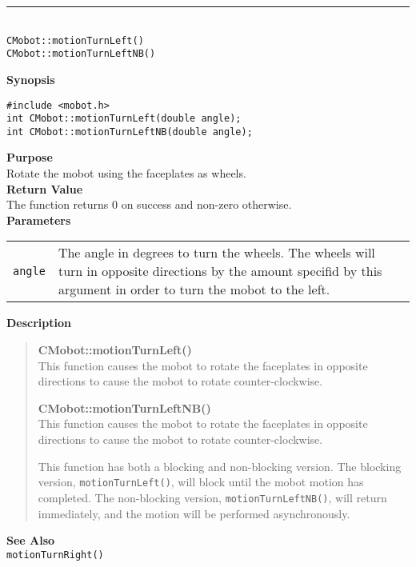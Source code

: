 \noindent
\vspace{5pt}
\rule{4.5in}{0.015in}\\
\noindent
{\LARGE \texttt{CMobot::motionTurnLeft()}}\\
{\LARGE \texttt{CMobot::motionTurnLeftNB()}}\\
{}

\noindent
{\bf Synopsis}
\vspace{-8pt}
\begin{verbatim}
#include <mobot.h>
int CMobot::motionTurnLeft(double angle);
int CMobot::motionTurnLeftNB(double angle);
\end{verbatim}

\noindent
{\bf Purpose}\\
Rotate the mobot using the faceplates as wheels.\\

\noindent
{\bf Return Value}\\
The function returns 0 on success and non-zero otherwise.\\

\noindent
{\bf Parameters}\\
\vspace{-0.1in}
\begin{description}
\item               
\begin{tabular}{p{10 mm}p{145 mm}}
\texttt{angle} & The angle in degrees to turn the wheels. The wheels will turn in opposite directions by the amount specifid by this argument in order to turn the mobot to the left. \\
\end{tabular}
\end{description}

\noindent
{\bf Description}\\
\vspace{-12pt}
\begin{quote}
{\bf CMobot::motionTurnLeft()}\\
This function causes the mobot to rotate the faceplates in opposite directions
to cause the mobot to rotate counter-clockwise.

{\bf CMobot::motionTurnLeftNB()}\\
This function causes the mobot to rotate the faceplates in opposite directions
to cause the mobot to rotate counter-clockwise.

This function has both a blocking and non-blocking version.
The blocking version, \texttt{motionTurnLeft()}, will block until the
mobot motion has completed. The non-blocking version, \texttt{motionTurnLeftNB()},
will return immediately, and the motion will be performed asynchronously.\\
\end{quote}


\noindent
{\bf See Also}\\
\texttt{motionTurnRight()}

